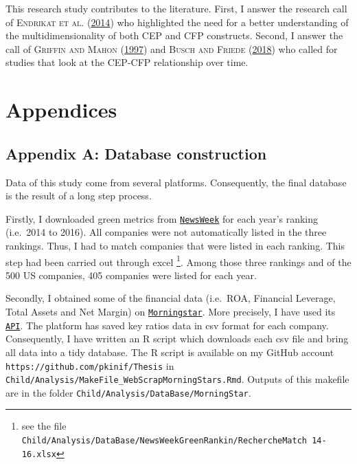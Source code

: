 \documentclass[12pt,]{article}
\let\rmarkdownfootnote\footnote%
\def\footnote{\protect\rmarkdownfootnote}
\begin{document}
This research study contributes to the literature. First, I answer the
research call of \textsc{Endrikat et al.}
(\protect\hyperlink{ref-EndrikatMakingsenseconflicting2014}{2014}) who
highlighted the need for a better understanding of the
multidimensionality of both CEP and CFP constructs. Second, I answer the
call of \textsc{Griffin and Mahon}
(\protect\hyperlink{ref-Griffin1997}{1997}) and \textsc{Busch and
Friede} (\protect\hyperlink{ref-Busch2018}{2018}) who called for studies
that look at the CEP-CFP relationship over time.

\newpage


\section*{Appendices}\label{appendices}

\hypertarget{appendix-a-database-construction}{\subsection*{Appendix A:
Database construction}\label{appendix-a-database-construction}}

Data of this study come from several platforms. Consequently, the final
database is the result of a long step process.

Firstly, I downloaded green metrics from
\href{http://www.newsweek.com/2014/06/13/newsweeks-green-rankings-2014-253482.html}{\texttt{NewsWeek}}
for each year's ranking (i.e.~2014 to 2016). All companies were not
automatically listed in the three rankings. Thus, I had to match
companies that were listed in each ranking. This step had been carried
out through excel
\footnote{see the file \texttt{Child/Analysis/DataBase/NewsWeekGreenRankin/RechercheMatch 14-16.xlsx}}.
Among those three rankings and of the 500 US companies, 405 companies
were listed for each year.

Secondly, I obtained some of the financial data (i.e.~ROA, Financial
Leverage, Total Assets and Net Margin) on
\href{http://www.morningstar.be/be/default.aspx}{\texttt{Morningstar}}.
More precisely, I have used its
\href{https://gist.github.com/hahnicity/45323026693cdde6a116\#file-morningstar-api-md}{\texttt{API}}.
The platform has saved key ratios data in csv format for each company.
Consequently, I have written an R script which downloads each csv file
and bring all data into a tidy database. The R script is available on my
GitHub account \texttt{https://github.com/pkinif/Thesis} in
\texttt{Child/Analysis/MakeFile\_WebScrapMorningStars.Rmd}. Outputs of
this makefile are in the folder
\texttt{Child/Analysis/DataBase/MorningStar}.
\end{document}

